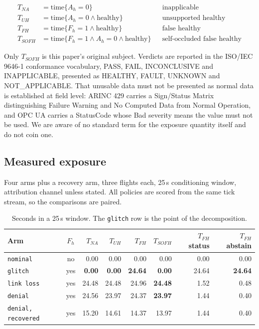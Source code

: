 \documentclass[11pt,a4paper]{article}
\newcommand{\code}[1]{\texttt{\small #1}}
\begin{document}
\begin{align*}
T_{NA}   &= \text{time}\{ A_h = 0 \} & &\text{inapplicable}\\
T_{UH}   &= \text{time}\{ A_h = 0 \wedge \text{healthy} \} &
  &\text{unsupported healthy}\\
T_{FH}   &= \text{time}\{ F_h = 1 \wedge \text{healthy} \} &
  &\text{false healthy}\\
T_{SOFH} &= \text{time}\{ F_h = 1 \wedge A_h = 0 \wedge \text{healthy} \} &
  &\text{self-occluded false healthy}
\end{align*}

Only $T_{SOFH}$ is this paper's original subject. Verdicts are reported in the
ISO/IEC 9646-1 conformance vocabulary, PASS, FAIL, INCONCLUSIVE and
INAPPLICABLE, presented as HEALTHY, FAULT, UNKNOWN and NOT\_APPLICABLE. That
unusable data must not be presented as normal data is established at field
level: ARINC 429 carries a Sign/Status Matrix distinguishing Failure Warning
and No Computed Data from Normal Operation, and OPC UA carries a StatusCode
whose Bad severity means the value must not be used. We are aware of no
standard term for the exposure quantity itself and do not coin one.

\subsection{Measured exposure}

Four arms plus a recovery arm, three flights each, 25\,s conditioning window,
attribution channel unless stated. All policies are scored from the same tick
stream, so the comparisons are paired.

\begin{table}[h]
\centering
\small
\begin{tabular}{lcrrrrrr}
\toprule
Arm & $F_h$ & $T_{NA}$ & $T_{UH}$ & $T_{FH}$ & $T_{SOFH}$ &
$T_{FH}$ status & $T_{FH}$ abstain \\
\midrule
\code{nominal}   & no  & 0.00  & 0.00  & 0.00  & 0.00  & 0.00 & 0.00 \\
\code{glitch}    & yes & \textbf{0.00}  & \textbf{0.00}  &
\textbf{24.64} & \textbf{0.00}  & 24.64 & \textbf{24.64} \\
\code{link loss} & yes & 24.48 & 24.48 & 24.96 & \textbf{24.48} & 1.52 & 0.48 \\
\code{denial}    & yes & 24.56 & 23.97 & 24.37 & \textbf{23.97} & 1.44 & 0.40 \\
\code{denial, recovered} & yes & 15.20 & 14.61 & 14.37 & 13.97 & 1.44 & 0.40 \\
\bottomrule
\end{tabular}
\caption{Seconds in a 25\,s window. The \code{glitch} row is the point of the
decomposition.}
\label{tab:fourq}
\end{table}
\end{document}
